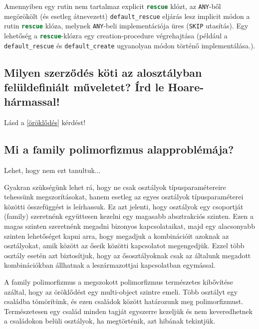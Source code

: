 	Amennyiben egy rutin nem tartalmaz explicit \lstinline[language=Eiffel]|rescue| klózt, az \lstinline[language=Eiffel]|ANY|-ből megörökölt (és esetleg átnevezett) \lstinline[language=Eiffel]|default_rescue| eljárás lesz implicit módon a rutin \lstinline[language=Eiffel]|rescue| klóza, melynek \lstinline[language=Eiffel]|ANY|-beli implementációja üres (\lstinline[language=Eiffel]|SKIP| utasítás). Egy lehetőség a \lstinline[language=Eiffel]|rescue|-klózra egy creation-procedure végrehajtása (például a \lstinline[language=Eiffel]|default_rescue| és \lstinline[language=Eiffel]|default_create| ugyanolyan módon történő implementálása.).
	
\subsection{ Milyen szerződés köti az alosztályban felüldefiniált műveletet? Írd le Hoare-hármassal! }
	Lásd a \ref{öröklődés} kérdést!
	
\subsection{ Mi a family polimorfizmus alapproblémája? }
	Lehet, hogy nem ezt tanultuk...

	Gyakran szükségünk lehet rá, hogy ne csak osztályok típusparamétereire tehessünk megszorításokat, hanem esetleg az egyes osztályok típusparaméterei közötti összefüggést is leírhassuk. Ez azt jelenti, hogy osztályok egy csoportját (family) szeretnénk együttesen kezelni egy magasabb absztrakciós szinten. Ezen a magas szinten szeretnénk megadni bizonyos kapcsolataikat, majd egy alacsonyabb szinten lehetőséget kapni arra, hogy megadjuk a kombinációit azoknak az osztályokat, amik között az őseik közötti kapcsolatot megengedjük. Ezzel több osztály esetén azt biztosítjuk, hogy az ősosztályoknak csak az általunk megadott kombinációkban állhatnak a leszármazottjai kapcsolatban egymással.

	A family polimorfizmus a megszokott polimorfizmus természetes kibővítése azáltal, hogy az öröklődést egy multi-object szintre emeli. Több osztályt egy családba tömörítünk, és ezen családok között határozunk meg polimorfizmust. Természetesen egy család minden tagját egyszerre kezeljük és nem keveredhetnek a családokon belüli osztályok, ha megtörténik, azt hibának tekintjük.
	

